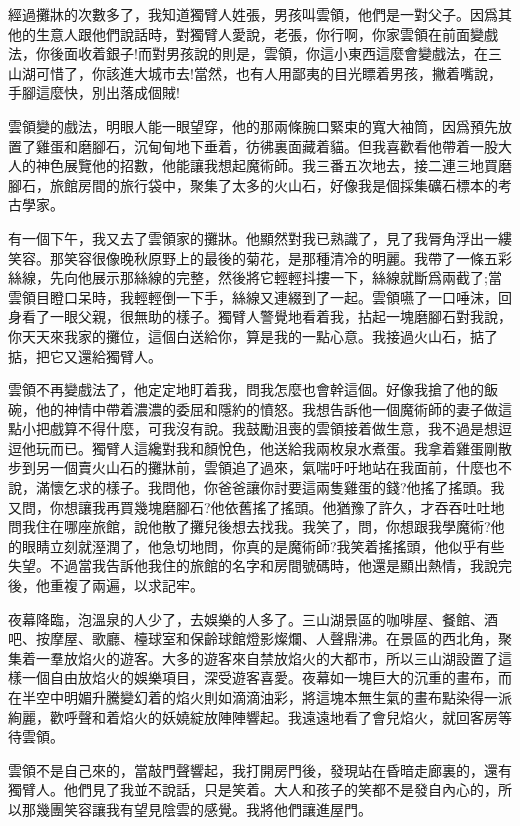 \documentclass[a6paper]{article}
\begin{document}
經過攤牀的次數多了，我知道獨臂人姓張，男孩叫雲領，他們是一對父子。因爲其他的生意人跟他們說話時，對獨臂人愛說，老張，你行啊，你家雲領在前面變戲法，你後面收着銀子!而對男孩說的則是，雲領，你這小東西這麼會變戲法，在三山湖可惜了，你該進大城市去!當然，也有人用鄙夷的目光瞟着男孩，撇着嘴說，手腳這麼快，別出落成個賊!

雲領變的戲法，明眼人能一眼望穿，他的那兩條腕口緊束的寬大袖筒，因爲預先放置了雞蛋和磨腳石，沉甸甸地下垂着，彷彿裏面藏着貓。但我喜歡看他帶着一股大人的神色展覽他的招數，他能讓我想起魔術師。我三番五次地去，接二連三地買磨腳石，旅館房間的旅行袋中，聚集了太多的火山石，好像我是個採集礦石標本的考古學家。

有一個下午，我又去了雲領家的攤牀。他顯然對我已熟識了，見了我脣角浮出一縷笑容。那笑容很像晚秋原野上的最後的菊花，是那種清冷的明麗。我帶了一條五彩絲線，先向他展示那絲線的完整，然後將它輕輕抖摟一下，絲線就斷爲兩截了;當雲領目瞪口呆時，我輕輕倒一下手，絲線又連綴到了一起。雲領嚥了一口唾沫，回身看了一眼父親，很無助的樣子。獨臂人警覺地看着我，拈起一塊磨腳石對我說，你天天來我家的攤位，這個白送給你，算是我的一點心意。我接過火山石，掂了掂，把它又還給獨臂人。

雲領不再變戲法了，他定定地盯着我，問我怎麼也會幹這個。好像我搶了他的飯碗，他的神情中帶着濃濃的委屈和隱約的憤怒。我想告訴他一個魔術師的妻子做這點小把戲算不得什麼，可我沒有說。我鼓勵沮喪的雲領接着做生意，我不過是想逗逗他玩而已。獨臂人這纔對我和顏悅色，他送給我兩枚泉水煮蛋。我拿着雞蛋剛散步到另一個賣火山石的攤牀前，雲領追了過來，氣喘吁吁地站在我面前，什麼也不說，滿懷乞求的樣子。我問他，你爸爸讓你討要這兩隻雞蛋的錢?他搖了搖頭。我又問，你想讓我再買幾塊磨腳石?他依舊搖了搖頭。他猶豫了許久，才吞吞吐吐地問我住在哪座旅館，說他散了攤兒後想去找我。我笑了，問，你想跟我學魔術?他的眼睛立刻就溼潤了，他急切地問，你真的是魔術師?我笑着搖搖頭，他似乎有些失望。不過當我告訴他我住的旅館的名字和房間號碼時，他還是顯出熱情，我說完後，他重複了兩遍，以求記牢。

夜幕降臨，泡溫泉的人少了，去娛樂的人多了。三山湖景區的咖啡屋、餐館、酒吧、按摩屋、歌廳、檯球室和保齡球館燈影燦爛、人聲鼎沸。在景區的西北角，聚集着一羣放焰火的遊客。大多的遊客來自禁放焰火的大都市，所以三山湖設置了這樣一個自由放焰火的娛樂項目，深受遊客喜愛。夜幕如一塊巨大的沉重的畫布，而在半空中明媚升騰變幻着的焰火則如滴滴油彩，將這塊本無生氣的畫布點染得一派絢麗，歡呼聲和着焰火的妖嬈綻放陣陣響起。我遠遠地看了會兒焰火，就回客房等待雲領。

雲領不是自己來的，當敲門聲響起，我打開房門後，發現站在昏暗走廊裏的，還有獨臂人。他們見了我並不說話，只是笑着。大人和孩子的笑都不是發自內心的，所以那幾團笑容讓我有望見陰雲的感覺。我將他們讓進屋門。
\end{document}
